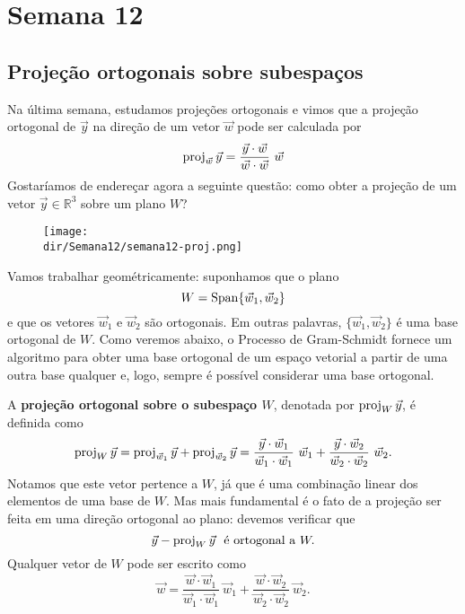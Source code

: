 \documentclass[../livro.tex]{subfiles}  %
\providecommand{\dir}{..}
\begin{document}


\chapter{Semana 12}

\section{Projeção ortogonais sobre subespaços}

Na última semana, estudamos projeções ortogonais e vimos que a projeção ortogonal de $\vec{y}$ na direção de um vetor $\vec{w}$ pode ser calculada por
\begin{equation}
\proj_{\vec{w}} \vec{y} = \frac{\vec{y} \cdot \vec{w}}{\vec{w} \cdot \vec{w}} \ \vec{w}
\end{equation} Gostaríamos de endereçar agora a seguinte questão: como obter a projeção de um vetor $\vec{y} \in \mathbb{R}^3$ sobre um plano $W$?

\begin{figure}[h!]
\begin{center}
\texttt{[image: \\dir/Semana12/semana12-proj.png]}
\end{center}
\end{figure}
\noindent Vamos trabalhar geométricamente: suponhamos que o plano
\begin{equation}
W = \operatorname{Span} \{\vec{w}_1, \vec{w}_2\}
\end{equation} e que os vetores $\vec{w}_1$ e $\vec{w}_2$ são ortogonais. Em outras palavras, $\{\vec{w}_1, \vec{w}_2\}$ é uma base ortogonal de $W$. Como veremos abaixo, o Processo de Gram-Schmidt fornece um algoritmo para obter uma base ortogonal de um espaço vetorial a partir de uma outra base qualquer e, logo, sempre é possível considerar uma base ortogonal.

A \textbf{projeção ortogonal sobre o subespaço $W$}, denotada por $\operatorname{proj}_W \vec{y}$, é definida como
\begin{equation}
\operatorname{proj}_W \vec{y} = \operatorname{proj}_{\vec{w}_1} \vec{y} + \operatorname{proj}_{\vec{w}_2} \vec{y} = \frac{\vec{y} \cdot \vec{w}_1}{\vec{w}_1 \cdot \vec{w}_1} \ \vec{w}_1 + \frac{\vec{y} \cdot \vec{w}_2}{\vec{w}_2 \cdot \vec{w}_2} \ \vec{w}_2.
\end{equation} Notamos que este vetor pertence a $W$, já que é uma combinação linear dos elementos de uma base de $W$. Mas mais fundamental é o fato de a projeção ser feita em uma direção ortogonal ao plano: devemos verificar que
\begin{equation}
\vec{y} - \operatorname{proj}_W \vec{y} \ \text{ é ortogonal a }  W.
\end{equation} Qualquer vetor de $W$ pode ser escrito como
\begin{equation}
\vec{w} = \frac{\vec{w} \cdot \vec{w}_1}{\vec{w}_1 \cdot \vec{w}_1} \ \vec{w}_1 + \frac{\vec{w} \cdot \vec{w}_2}{\vec{w}_2 \cdot \vec{w}_2} \ \vec{w}_2.
\end{equation}
\end{document}
